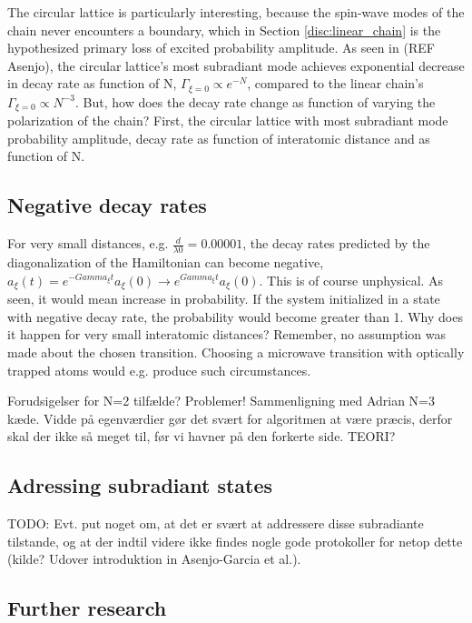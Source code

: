 \documentclass{article}
\begin{document}
The circular lattice is particularly interesting, because the spin-wave modes of the chain never encounters a boundary, which in Section \ref{disc:linear_chain} is the hypothesized primary loss of excited probability amplitude. As seen in (REF Asenjo), the circular lattice's most subradiant mode achieves exponential decrease in decay rate as function of N, $\Gamma_{\xi = 0} \propto e^{-N}$, compared to the linear chain's $\Gamma_{\xi=0} \propto N^{-3}$. But, how does the decay rate change as function of varying the polarization of the chain? First, the circular lattice with most subradiant mode probability amplitude, decay rate as function of interatomic distance and as function of N. 

\subsection{Negative decay rates}

For very small distances, e.g. $\frac{d}{\lambda0} = 0.00001$, the decay rates predicted by the diagonalization of the Hamiltonian can become negative, $a_\xi(t)=e^{-Gamma_\xi t} a_\xi (0) \rightarrow e^{Gamma_\xi t} a_\xi (0)$. This is of course unphysical. As seen, it would mean increase in probability. If the system initialized in a state with negative decay rate, the probability would become greater than 1. Why does it happen for very small interatomic distances? Remember, no assumption was made about the chosen transition. Choosing a microwave transition with optically trapped atoms would e.g. produce such circumstances. 

Forudsigelser for N=2 tilfælde? Problemer! Sammenligning med Adrian N=3 kæde. Vidde på egenværdier gør det svært for algoritmen at være præcis, derfor skal der ikke så meget til, før vi havner på den forkerte side. TEORI?

\subsection{Adressing subradiant states}

TODO: Evt. put noget om, at det er svært at addressere disse subradiante tilstande, og at der indtil videre ikke findes nogle gode protokoller for netop dette (kilde? Udover introduktion in Asenjo-Garcia et al.). 

\subsection{Further research} \label{sec:further}
\end{document}
